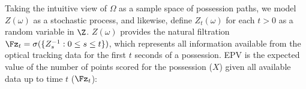 \documentclass[EPV_JASA.tex]{subfiles}
\begin{document}
Taking the intuitive view of $\Omega$ as a sample space of possession paths, we model $Z(\omega)$ as a stochastic process, and likewise, define $Z_t(\omega)$ for each $t > 0$ as a random variable in $\Z$. $Z(\omega)$ provides the natural filtration $\Fz_t = \sigma(\{Z_s^{-1}: 0 \leq s \leq t\})$, which represents all information available from the optical tracking data for the first $t$ seconds of a possession.
EPV is the expected value of the number of points scored for the possession ($X$) given all available data up to time $t$ ($\Fz_t$):



\end{document}
